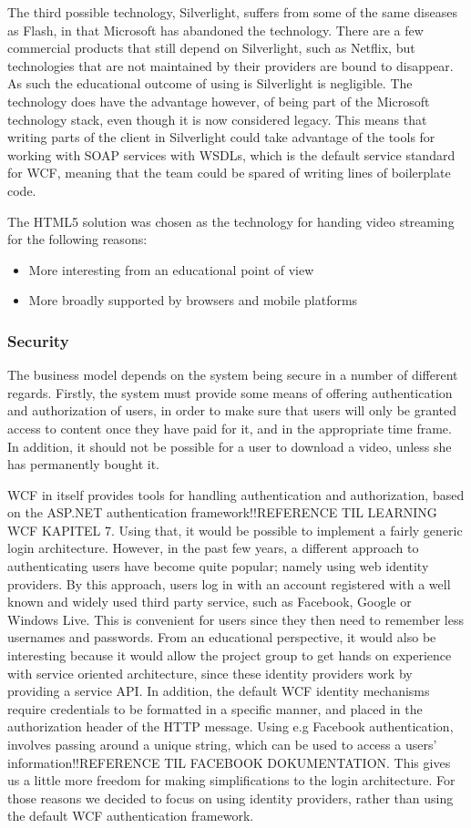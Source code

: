 The third possible technology, Silverlight, suffers from some of the same diseases as Flash, in that Microsoft has abandoned the technology. There are a few commercial products that still depend on Silverlight, such as Netflix, but technologies that are not maintained by their providers are bound to disappear. As such the educational outcome of using is Silverlight is negligible. The technology does have the advantage however, of being part of the Microsoft technology stack, even though it is now considered legacy. This means that writing parts of the client in Silverlight could take advantage of the tools for working with SOAP services with WSDLs, which is the default service standard for WCF, meaning that the team could be spared of writing lines of boilerplate code.

The HTML5 solution was chosen as the technology for handing video streaming for the following reasons:
\begin{itemize}
\item More interesting from an educational point of view
\item More broadly supported by browsers and mobile platforms
\end{itemize}

\subsubsection{Security} \label{Security}
The business model depends on the system being secure in a number of different regards. Firstly, the system must provide some means of offering authentication and authorization of users, in order to make sure that users will only be granted access to content once they have paid for it, and in the appropriate time frame. In addition, it should not be possible for a user to download a video, unless she has permanently bought it.

WCF in itself provides tools for handling authentication and authorization, based on the ASP.NET authentication framework!!REFERENCE TIL LEARNING WCF KAPITEL 7. Using that, it would be possible to implement a fairly generic login architecture. However, in the past few years, a different approach to authenticating users have become quite popular; namely using web identity providers. By this approach, users log in with an account registered with a well known and widely used third party service, such as Facebook, Google or Windows Live. This is convenient for users since they then need to remember less usernames and passwords. From an educational perspective, it would also be interesting because it would allow the project group to get hands on experience with service oriented architecture, since these identity providers work by providing a service API. In addition, the default WCF identity mechanisms require credentials to be formatted in a specific manner, and placed in the authorization header of the HTTP message. Using e.g Facebook authentication, involves passing around a unique string, which can be used to access a users' information!!REFERENCE TIL FACEBOOK DOKUMENTATION. This gives us a little more freedom for making simplifications to the login architecture. For those reasons we decided to focus on using identity providers, rather than using the default WCF authentication framework.

